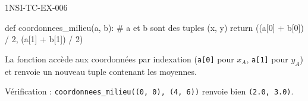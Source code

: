 \begin{corrige}{1NSI-TC-EX-006}
\begin{python}
def coordonnees_milieu(a, b):
    # a et b sont des tuples (x, y)
    return ((a[0] + b[0]) / 2, (a[1] + b[1]) / 2)
\end{python}

La fonction accède aux coordonnées par indexation (\lstinline{a[0]} pour $x_A$, \lstinline{a[1]} pour $y_A$) et renvoie un nouveau tuple contenant les moyennes.

Vérification : \lstinline{coordonnees_milieu((0, 0), (4, 6))} renvoie bien \lstinline{(2.0, 3.0)}.
\end{corrige}
